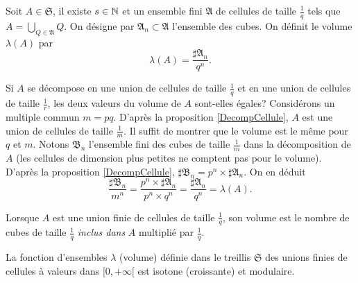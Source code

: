 \begin{defi}\label{DefVolUnionCell}
Soit $A \in \mathfrak{S}$, il existe $s\in \mathbb{N}$ et un ensemble fini $\mathfrak{A}$ de cellules de taille $\frac{1}{q}$ tels que $A = \bigcup_{Q\in \mathfrak{A}} Q$. On désigne par $\mathfrak{A}_n \subset \mathfrak{A}$ l'ensemble des cubes. On définit le volume $\lambda(A)$ par
\begin{displaymath}
 \lambda(A) = \frac{\sharp \mathfrak{A}_n}{q^{n}}.
\end{displaymath}
\end{defi}
\begin{demo}
 Si $A$ se décompose en une union de cellules de taille $\frac{1}{q}$ et en une union de cellules de taille $\frac{1}{r}$, les deux valeurs du volume de $A$ sont-elles égales?\newline
 Considérons un multiple commun $m=pq$. D'après la proposition \ref{DecompCellule}, $A$ est une union de cellules de taille $\frac{1}{m}$. Il suffit de montrer que le volume est le même pour $q$ et $m$.\newline
 Notons $\mathfrak{B}_n$ l'ensemble fini des cubes de taille $\frac{1}{m}$ dans la décomposition de $A$ (les cellules de dimension plus petites ne comptent pas pour le volume). D'après la proposition \ref{DecompCellule}, $\sharp \mathfrak{B}_n = p^n \times \sharp \mathfrak{A}_n$. On en déduit
 \begin{displaymath}
  \frac{\sharp \mathfrak{B}_n}{m^{n}} = \frac{p^n \times \sharp \mathfrak{A}_n}{p^n \times q^{n}} = \frac{\sharp \mathfrak{A}_n}{q^{n}} = \lambda(A).
 \end{displaymath}
\end{demo}
\begin{rem}
 Lorsque $A$ est une union finie de cellules de taille $\frac{1}{q}$, son volume est le nombre de cubes de taille $\frac{1}{q}$ \emph{inclus dans } $A$ multiplié par $\frac{1}{q}$.
\end{rem}
\begin{propn}
 La fonction d'ensembles $\lambda$ (volume) définie dans le treillis $\mathfrak{S}$ des unions finies de cellules à valeurs dans $[0,+\infty[$ est isotone (croissante) et modulaire.
\end{propn}
